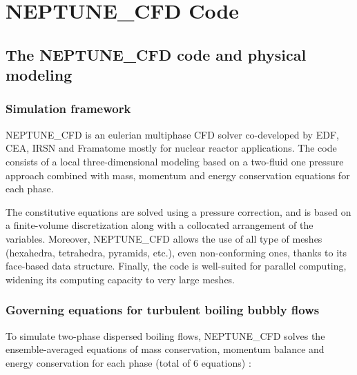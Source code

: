 
\chapter{NEPTUNE\_CFD Code} %

\label{ch:ncfd} %



\section{The NEPTUNE\_CFD code and physical modeling}
\label{sec:ncfd}

\subsection{Simulation framework}

NEPTUNE\_CFD is an eulerian multiphase CFD solver co-developed by EDF, CEA, IRSN and Framatome mostly for nuclear reactor applications.
The code consists of a local three-dimensional modeling based on a two-fluid one pressure approach combined with mass, momentum and energy conservation equations for each phase\cite{Guelfi2007}. 

The constitutive equations are solved using a pressure correction, and is based on a finite-volume discretization along with a collocated arrangement of the variables. Moreover, NEPTUNE\_CFD allows the use of all type of meshes (hexahedra, tetrahedra, pyramids, etc.), even non-conforming ones, thanks to its face-based data structure. Finally, the code is well-suited for parallel computing, widening its computing capacity to very large meshes.


\subsection{Governing equations for turbulent boiling bubbly flows}

To simulate two-phase dispersed boiling flows, NEPTUNE\_CFD solves the ensemble-averaged equations of mass conservation, momentum balance and energy conservation for each phase (total of 6 equations) : 


